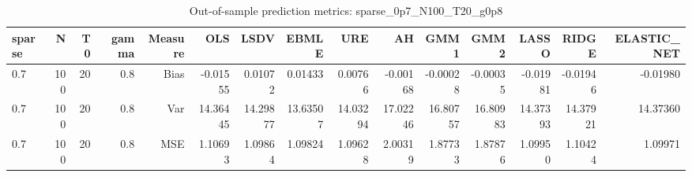\begin{table}[!htbp]\centering
\caption{Out-of-sample prediction metrics: sparse_0p7_N100_T20_g0p8}
\label{tab:table3_sparse_0p7_N100_T20_g0p8}
\begin{tabular}{lrrrrrrrrrrrrrr}
\hline
sparse & N & T0 & gamma & Measure & OLS & LSDV & EBMLE & URE & AH & GMM1 & GMM2 & LASSO & RIDGE & ELASTIC_NET \\
\hline
0.7 & 100 & 20 & 0.8 & Bias & -0.01555 & 0.01072 & 0.01433 & 0.00766 & -0.00168 & -0.00028 & -0.00035 & -0.01981 & -0.01946 & -0.01980 \\
0.7 & 100 & 20 & 0.8 & Var & 14.36445 & 14.29877 & 13.63507 & 14.03294 & 17.02246 & 16.80757 & 16.80983 & 14.37393 & 14.37921 & 14.37360 \\
0.7 & 100 & 20 & 0.8 & MSE & 1.10693 & 1.09864 & 1.09824 & 1.09628 & 2.00319 & 1.87733 & 1.87876 & 1.09950 & 1.10424 & 1.09971 \\
\hline
\end{tabular}
\end{table}

